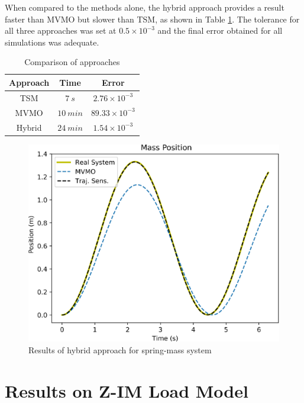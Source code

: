 When compared to the methods alone, the hybrid approach provides a result faster than MVMO but slower than TSM, as shown in Table \ref{tab: SM}. The tolerance for all three approaches was set at $0.5 \times 10^{-3}$ and the final error obtained for all simulations was adequate.

\begin{table}[]
	\caption{Comparison of approaches}
	\begin{center}
	\begin{tabular}{c|c|c}
		Approach & Time & Error \\
		\hline
		TSM  & $7 \ s$  & $2.76\times 10^{-3}$ \\
		MVMO  & $10 \ min$  & $89.33\times 10^{-3}$\\
		Hybrid  & $24 \ min$  & $1.54\times 10^{-3}$
	\end{tabular}
	\end{center}
	\label{tab: SM}
\end{table}




\begin{figure}[h]
	\caption{Results of hybrid approach for spring-mass system}
	\begin{center}
		\includegraphics[scale=0.8]{Images/SpringMass.eps}
	\end{center}
	\label{fig: spring-mass}
\end{figure}

\section{Results on Z-IM Load Model}

